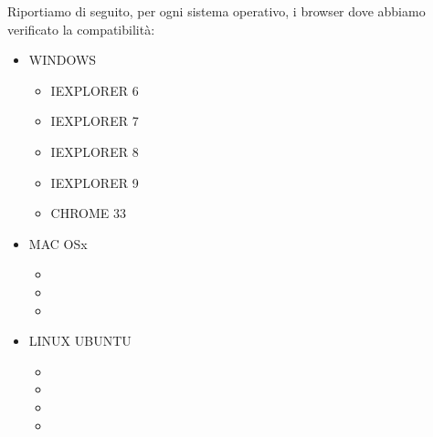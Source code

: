 Riportiamo di seguito, per ogni sistema operativo, i browser dove abbiamo verificato la compatibilit\`a:
\begin{itemize}
		\item WINDOWS
		\begin{itemize}
			\item IEXPLORER 6
			\item IEXPLORER 7
			\item IEXPLORER 8
			\item IEXPLORER 9
			\item CHROME 33
		\end{itemize}
		\item MAC OSx
		\begin{itemize}
			\item
			\item
			\item
		\end{itemize}
		\item LINUX UBUNTU
		\begin{itemize}
			\item
			\item
			\item
			\item
		\end{itemize}
\end{itemize}